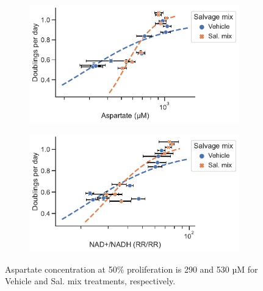 \begin{figure}
     \centering
     \begin{subfigure}[b]{0.49\textwidth}
         \includegraphics[width=\textwidth]{figures/chap2/app/HCT116_Met_Asp_vs_prlfr.pdf}
         \caption{}
         \label{fig:app_ch2:HCT116_Met_Asp_vs_prlfr}
     \end{subfigure}
     \hfill
     \begin{subfigure}[b]{0.49\textwidth}
         \includegraphics[width=\textwidth]{figures/chap2/app/HCT116_Met_NAD_vs_prlfr.pdf}
         \caption{}
         \label{fig:app_ch2:HCT116_Met_NAD_vs_prlfr}
     \end{subfigure}
        \caption[hhhh]{
        Aspartate concentration at 50\% proliferation is 290 and 530 µM for Vehicle and Sal. mix treatments, respectively.
        }
        \label{fig:app_ch2:HCT116_asp_prlfr_met}
\end{figure}



